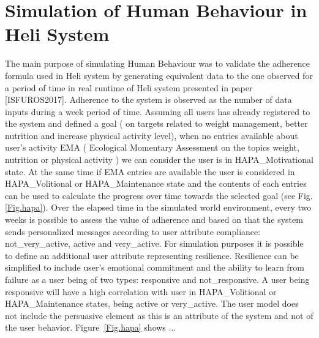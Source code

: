 \documentclass{llncs}
\begin{document}
\section {Simulation of Human Behaviour in Heli System}
\label{sec.helimodel}
The main purpose of simulating Human Behaviour was to validate the adherence formula used in Heli system by generating equivalent data to the one observed for a period of time in real runtime of Heli system presented in paper [ISFUROS2017].
Adherence to the system is observed as the number of data inputs during a week period of time. Assuming all users has already registered to the system and defined a goal ( on targets related to weight management, better nutrition and increase physical activity level), when no entries available about user’s activity EMA ( Ecological Momentary Assessment on the topics weight, nutrition or physical activity ) we can consider the user is in HAPA\_Motivational state. At the same time if EMA entries are available the user is considered in HAPA\_Volitional or HAPA\_Maintenance state and the contents of each entries can be used to calculate the progress over time towards the selected goal (see Fig.\ref{Fig.hapa}).
Over the elapsed time in the simulated world environment, every two weeks is possible to assess the value of adherence and based on that the system sends personalized messages according to user attribute compliance: not\_very\_active, active and very\_active. For simulation purposes it is possible to define an additional user attribute representing resilience. Resilience can be simplified to include user’s emotional commitment and the ability to learn from failure as a user being of two types: responsive and not\_responsive. A user being responsive will have a high correlation with user in HAPA\_Volitional or HAPA\_Maintenance states, being active or very\_active. The user model does not include the persuasive element as this is an attribute of the system and not of the user behavior.
Figure~\ref{Fig.hapa} shows ...
\end{document}
